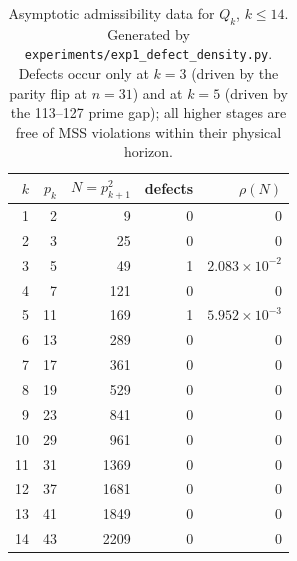 \documentclass[cupthm,crop,info]{CUP-JNL-ETS}
\theoremstyle{cupplain}
\theoremstyle{cupdefinition}
\theoremstyle{cupremark}
\numberwithin{equation}{section}
\begin{document}
\begin{table}[h]
  \centering
  \begin{tabular}{rrrrr}
    \toprule
    $k$ & $p_k$ & $N = p_{k+1}^2$ & defects & $\rho(N)$ \\
    \midrule
    1  & 2  & 9    & 0 & $0$ \\
    2  & 3  & 25   & 0 & $0$ \\
    3  & 5  & 49   & 1 & $2.083 \times 10^{-2}$ \\
    4  & 7  & 121  & 0 & $0$ \\
    5  & 11 & 169  & 1 & $5.952 \times 10^{-3}$ \\
    6  & 13 & 289  & 0 & $0$ \\
    7  & 17 & 361  & 0 & $0$ \\
    8  & 19 & 529  & 0 & $0$ \\
    9  & 23 & 841  & 0 & $0$ \\
    10 & 29 & 961  & 0 & $0$ \\
    11 & 31 & 1369 & 0 & $0$ \\
    12 & 37 & 1681 & 0 & $0$ \\
    13 & 41 & 1849 & 0 & $0$ \\
    14 & 43 & 2209 & 0 & $0$ \\
    \bottomrule
  \end{tabular}
  \caption{Asymptotic admissibility data for $Q_k$, $k \leq 14$.
    Generated by \texttt{experiments/exp1\_defect\_density.py}. Defects
    occur only at $k = 3$ (driven by the parity flip at $n = 31$) and at
    $k = 5$ (driven by the 113--127 prime gap); all higher stages are
    free of MSS violations within their physical horizon.}
  \label{tab:defect}
\end{table}

\appendix

\end{document}
